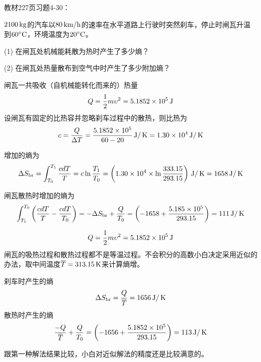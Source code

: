 \documentclass[CJK]{beamer}
\begin{document}
\begin{frame}
  \chtitle{\proid (\sthree)}
  \bch
  教材227页习题4-30：

  $2100\,\mathrm{kg}$的汽车以$80\,\mathrm{km}/\mathrm{h}$的速率在水平道路上行驶时突然刹车，停止时闸瓦升温到$60^\circ \mathrm{C}$，环境温度为$20^\circ \mathrm{C}$。
  \bitem
\item[(1)]{在闸瓦处机械能耗散为热时产生了多少熵？}
\item[(2)]{在闸瓦处热量散布到空气中时产生了多少附加熵？}
  \eitem
  \ech
\end{frame}


\begin{frame}
  \bch
  {\small
  闸瓦一共吸收（自机械能转化而来的）热量
  $$Q  = \frac{1}{2}m\upsilon^2 = 5.1852\times 10^5 \,\mathrm{J}$$
  设闸瓦有固定的比热容并忽略刹车过程中的散热，则比热为
  $$ c = \frac{Q}{\Delta T} = \frac{5.1852\times 10^5}{60-20}\,\mathrm{J}/\,\mathrm{K} = 1.30\times 10^4 \,\mathrm{J}/\,\mathrm{K}$$
  
  增加的熵为
  $$ \Delta S_{\rm br} = \int_{T_0}^{T_1} \frac{c dT}{T} = c\ln\frac{T_1}{T_0} = \left(1.30\times 10^4 \times \ln\frac{333.15}{293.15}\right) \,\mathrm{J}/\,\mathrm{K} = 1658 \,\mathrm{J}/\,\mathrm{K}$$

  闸瓦散热时增加的熵为
  $$\int_{T_1}^{T_0} \left(\frac{cdT}{T} -\frac{cdT}{T_0} \right) = -\Delta S_{\rm br} + \frac{Q}{T_0} = \left(-1658 + \frac{5.185\times 10^5}{293.15}\right) = 111 \,\mathrm{J}/\,\mathrm{K}$$
  
  }
  \ech
\end{frame}


\begin{frame}
  \bch
      {\small
        $$Q  = \frac{1}{2}m\upsilon^2 = 5.1852\times 10^5 \,\mathrm{J}$$
        闸瓦的吸热过程和散热过程都不是等温过程。不会积分的高数小白决定采用近似的办法，取中间温度$\overline{T} = 313.15\,\mathrm{K}$来计算熵增。
        
        刹车时产生的熵
        $$ \Delta S_{\rm br} = \frac{Q}{\overline{T}} = 1656 \,\mathrm{J}/\,\mathrm{K}$$
        散热时产生的熵
        $$ \frac{-Q}{\overline{T}} + \frac{Q}{T_0} =   \left(-1656 + \frac{5.1852\times 10^5}{293.15}\right) = 113 \,\mathrm{J}/\,\mathrm{K} $$

        \skipline
        
        {\scriptsize
        跟第一种解法结果比较，小白对近似解法的精度还是比较满意的。}
  }
  \ech
\end{frame}

\begin{frame}
  \bch
  \ech
\end{frame}
\end{document}
